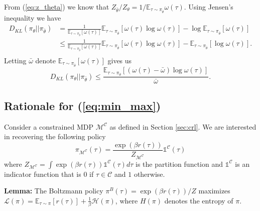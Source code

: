From (\ref{eq:z_theta}) we know that $Z_{\bar\theta}/Z_\theta=1/\mathbb{E}_{\tau\sim\pi_{\bar\theta}}\omega(\tau)$. Using Jensen's inequality we have
\begin{equation}
\begin{split}
    D_{KL}(\pi_{\theta}\vert\vert\pi_{\bar\theta})
    &= \frac{1}{\mathbb{E}_{\tau\sim\pi_{\bar\theta}}\left[\omega(\tau)\right]}\mathbb{E}_{\tau\sim\pi_{\bar\theta}} \left[\omega(\tau)\log\omega(\tau)\right] - \log \mathbb{E}_{\tau\sim\pi_{\bar\theta}}\left[\omega(\tau)\right]\\
    &\leq \frac{1}{\mathbb{E}_{\tau\sim\pi_{\bar\theta}}\left[\omega(\tau)\right]}\mathbb{E}_{\tau\sim\pi_{\bar\theta}} \left[\omega(\tau)\log\omega(\tau)\right] - \mathbb{E}_{\tau\sim\pi_{\bar\theta}}\left[\log\omega(\tau)\right].\\
\end{split}
\end{equation}
Letting $\bar{\omega}$ denote $\mathbb{E}_{\tau\sim\pi_{\bar\theta}}[\omega(\tau)]$ gives us
\begin{equation}
    D_{KL}(\pi_{\theta}\vert\vert\pi_{\bar\theta}) \leq \frac{\mathbb{E}_{\tau\sim\pi_{\bar\theta}} \left[(\omega(\tau)-\bar\omega)\log\omega(\tau)\right]}{\bar{\omega}}.
\end{equation}

\subsection{Rationale for (\ref{eq:min_max})}
\label{a:maxent}
Consider a constrained MDP $\mathcal{M}^\mathcal{C}$ as defined in Section \ref{sec:crl}. We are interested in recovering the following policy
\begin{equation}
    \pi_{\mathcal{M}^\mathcal{C}}(\tau) = \frac{\exp(\beta r(\tau))}{Z_{\mathcal{M}^\mathcal{C}}}\mathds{1}^\mathcal{C}(\tau)
    \label{eq:maxent_cons}
\end{equation}
where $Z_{\mathcal{M}^\mathcal{C}} = \int \exp(\beta r(\tau))\mathds{1}^\mathcal{C}(\tau) d\tau$ is the partition function and $\mathds{1}^\mathcal{C}$ is an indicator function that is $0$ if $\tau\in\mathcal{C}$ and $1$ otherwise.

\textbf{Lemma:} The Boltzmann policy $\pi^B(\tau) = \exp(\beta r(\tau))/Z$ maximizes $\mathcal{L}(\pi) = \mathbb{E}_{\tau\sim\pi}[r(\tau)] + \frac{1}{\beta}\mathcal{H}(\pi)$, where $H(\pi)$ denotes the entropy of $\pi$.

